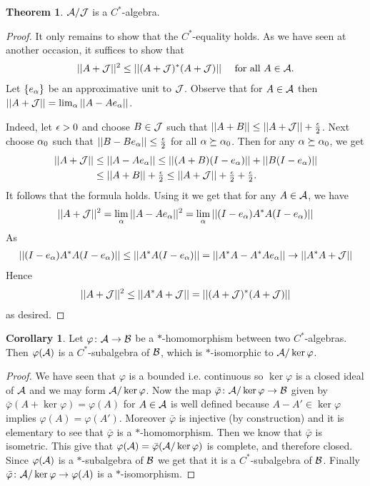 \documentclass[10pt,english,a4paper]{article}
\theoremstyle{definition}
\newtheorem*{theorem}{Theorem}
\newtheorem*{corollary}{Corollary}
\begin{document}
\begin{theorem}
    $\mathcal{A} /\mathcal{J}$ is a $C^*$-algebra.
\end{theorem}
\begin{proof}
    It only remains to show that the $C^*$-equality holds. As we have seen at
another occasion, it suffices to show that 
\begin{align*}
    ||A+\mathcal{J}||^2 \leq ||(A + \mathcal{J})^*(A+ \mathcal{J})||\quad \text{ for all } A \in \mathcal{A}.
\end{align*}
Let $\{e_{\alpha}\}$ be an approximative unit to $\mathcal{J}$. Observe that for 
$A \in \mathcal{A}$ then $||A + \mathcal{J}|| = \lim_{\alpha}||A-Ae_{\alpha}||$. 

Indeed, let $\epsilon > 0$ and choose $B \in \mathcal{J}$ such that 
$||A+B|| \leq ||A+\mathcal{J}|| + \tfrac{\epsilon}{2}$. Next choose $\alpha_0$ such that 
$||B-Be_{\alpha}|| \leq \tfrac{\epsilon}{2}$ for all $\alpha \succeq \alpha_0$. 
Then for any $\alpha \succeq \alpha_0$, we get
\begin{align*}
    ||A+\mathcal{J}|| &\leq ||A-Ae_{\alpha}|| \leq ||(A+B)(I-e_{\alpha})|| + ||B(I-e_{\alpha})|| \\
&\leq ||A+B|| + \tfrac{\epsilon}{2} \leq ||A+\mathcal{J}|| + \tfrac{\epsilon}{2}+ \tfrac{\epsilon}{2}.
\end{align*}
It follows that the formula holds. Using it we get that for any $A \in \mathcal{A}$,
we have
\begin{align*}
    ||A+\mathcal{J}||^2 &= \lim_{\alpha} ||A-Ae_{\alpha}||^2 = \lim_{\alpha} ||(I-e_{\alpha})A^*A (I-e_{\alpha})||\\
\end{align*}
As
\begin{align*}
    ||(I-e_{\alpha})A^*A (I-e_{\alpha})|| \leq ||A^*A (I-e_{\alpha})|| = ||A^*A-A^*Ae_{\alpha}|| \to || A^*A + \mathcal{J}|| 
\end{align*}
Hence 
\begin{align*}
||A + \mathcal{J}||^2 \leq ||A^*A + \mathcal{J}|| = ||(A + \mathcal{J})^*(A+\mathcal{J})||
\end{align*}
as desired. 
\end{proof}


\begin{corollary}
    Let $\varphi \colon \mathcal{A} \to \mathcal{B}$ be a $*$-homomorphism between two 
$C^*$-algebras. Then $\varphi(\mathcal{A})$ is a $C^*$-subalgebra of $\mathcal{B}$, which 
is $*$-isomorphic to $\mathcal{A} /\ker \varphi$. 
\end{corollary}
\begin{proof}
    We have seen that $\varphi$ is a bounded i.e. continuous so $\ker\varphi$
is a closed ideal of $\mathcal{A}$ and we may form $\mathcal{A}/\ker\varphi$.
Now the map $\bar{\varphi}\colon \mathcal{A}/\ker\varphi \to \mathcal{B}$ given by
$\bar{\varphi}(A + \ker\varphi) = \varphi(A)$ for $A \in \mathcal{A}$ is 
well defined because $A-A' \in \ker\varphi$ implies 
$\varphi(A) = \varphi(A')$.
Moreover $\bar{\varphi}$ is injective (by construction) and 
it is elementary to see that $\bar{\varphi}$ is a $*$-homomorphism. 
Then we know that $\bar{\varphi}$ is isometric. This give that 
$\varphi(\mathcal{A}) = \bar{\varphi} (\mathcal{A}/\ker\varphi)$ is complete, 
and therefore closed. Since $\varphi(\mathcal{A})$ is a $*$-subalgebra of $\mathcal{B}$ we
get that it is a $C^*$-subalgebra of $\mathcal{B}$. 
Finally $\bar{\varphi}\colon \mathcal{A}/\ker\varphi \to \varphi (A)$
is a $*$-isomorphism.
\end{proof}
\end{document}

